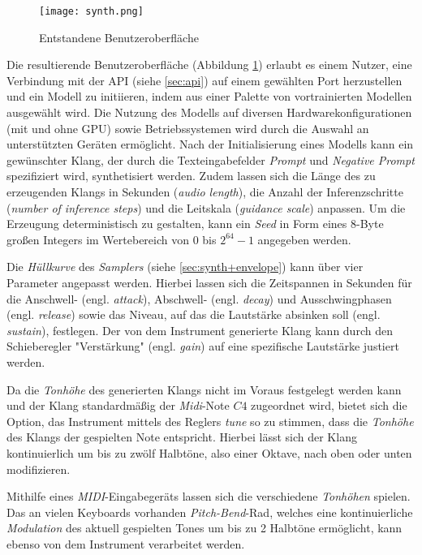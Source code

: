 \documentclass[
  a4paper,  %
  twoside,  %
  bibliography=totoc,
  headsepline,
  cleardoublepage=empty,
  parskip=half,
  draft=false
]{scrbook}
\begin{document}
{\begin{figure}[h]
  \centering
  \texttt{[image: synth.png]}
  \caption[Benutzeroberfläche]{Entstandene Benutzeroberfläche}
  \label{fig:synth}
\end{figure} 

Die resultierende Benutzeroberfläche (Abbildung \ref{fig:synth}) erlaubt es einem Nutzer, eine Verbindung mit der API (siehe \ref{sec:api}) auf einem gewählten Port herzustellen und ein Modell zu initiieren, indem aus einer Palette von vortrainierten Modellen ausgewählt wird. Die Nutzung des Modells auf diversen Hardwarekonfigurationen (mit und ohne GPU) sowie Betriebssystemen wird durch die Auswahl an unterstützten Geräten ermöglicht. Nach der Initialisierung eines Modells kann ein gewünschter Klang, der durch die Texteingabefelder \emph{Prompt} und \emph{Negative Prompt} spezifiziert wird, synthetisiert werden. Zudem lassen sich die Länge des zu erzeugenden Klangs in Sekunden (\emph{audio length}), die Anzahl der Inferenzschritte (\emph{number of inference steps}) und die Leitskala (\emph{guidance scale}) anpassen. Um die Erzeugung deterministisch zu gestalten, kann ein \emph{Seed} in Form eines 8-Byte großen Integers im Wertebereich von $0$ bis $2^{64}-1$ angegeben werden.

Die \emph{Hüllkurve} des \emph{Samplers} (siehe \ref{sec:synth+envelope}) kann über vier Parameter angepasst werden. Hierbei lassen sich die Zeitspannen in Sekunden für die Anschwell- (engl. \emph{attack}), Abschwell- (engl. \emph{decay}) und Ausschwingphasen (engl. \emph{release}) sowie das Niveau, auf das die Lautstärke absinken soll (engl. \emph{sustain}), festlegen. Der von dem Instrument generierte Klang kann durch den Schieberegler "Verstärkung" (engl. \emph{gain}) auf eine spezifische Lautstärke justiert werden.

Da die \emph{Tonhöhe} des generierten Klangs nicht im Voraus festgelegt werden kann und der Klang standardmäßig der \emph{Midi}-Note $C4$ zugeordnet wird, bietet sich die Option, das Instrument mittels des Reglers \emph{tune} so zu stimmen, dass die \emph{Tonhöhe} des Klangs der gespielten Note entspricht. Hierbei lässt sich der Klang kontinuierlich um bis zu zwölf Halbtöne, also einer Oktave, nach oben oder unten modifizieren.

Mithilfe eines \emph{MIDI}-Eingabegeräts lassen sich die verschiedene \emph{Tonhöhen} spielen. Das an vielen Keyboards vorhanden \emph{Pitch-Bend}-Rad, welches eine kontinuierliche \emph{Modulation} des aktuell gespielten Tones um bis zu 2 Halbtöne ermöglicht, kann ebenso von dem Instrument verarbeitet werden. 

}
\end{document}
